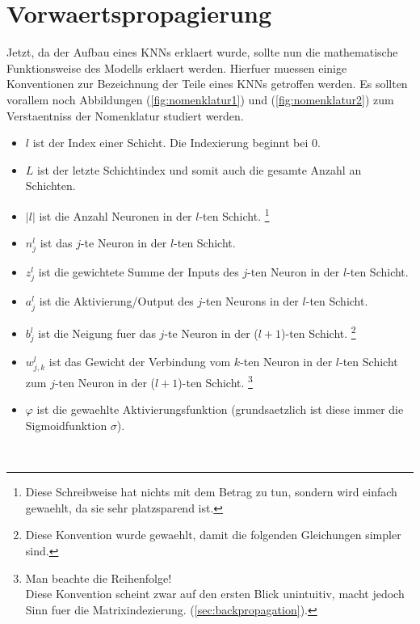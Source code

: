 \section{Vorwaertspropagierung}
Jetzt, da der Aufbau eines KNNs erklaert wurde, sollte nun die mathematische Funktionsweise
des Modells erklaert werden. Hierfuer muessen einige Konventionen zur
Bezeichnung der Teile eines KNNs getroffen werden. Es sollten vorallem noch
Abbildungen (\ref{fig:nomenklatur1}) und (\ref{fig:nomenklatur2}) zum Verstaentniss der Nomenklatur studiert werden.
\begin{itemize}
\item{$l$ ist der Index einer Schicht. Die Indexierung beginnt bei 0.}
\item{$L$ ist der letzte Schichtindex und somit auch die gesamte Anzahl an Schichten.}
\item{$|l|$ ist die Anzahl Neuronen in der $l$-ten Schicht.
    \footnote{
      Diese Schreibweise hat nichts mit dem Betrag zu tun, sondern wird einfach
      gewaehlt, da sie sehr platzsparend ist.
    }
  }
\item{$n_j^l$ ist das $j$-te Neuron in der $l$-ten Schicht.}
\item{$z_j^l$ ist die gewichtete Summe der Inputs des $j$-ten Neuron in der $l$-ten Schicht.}
\item{$a_j^l$ ist die Aktivierung/Output des $j$-ten Neurons in der $l$-ten Schicht.}
\item{$b_j^l$ ist die Neigung fuer das $j$-te Neuron in der ($l+1$)-ten Schicht.
    \footnote{
      Diese Konvention wurde gewaehlt, damit die folgenden Gleichungen simpler sind.
    }
  }
\item{$w_{j,k}^l$ ist das Gewicht der Verbindung vom $k$-ten Neuron
    in der $l$-ten Schicht zum $j$-ten Neuron in der ($l+1$)-ten Schicht.
    \footnote{
      Man beachte die Reihenfolge!\\
      Diese Konvention scheint zwar auf den ersten Blick unintuitiv, macht jedoch
      Sinn fuer die Matrixindezierung.
      (\ref{sec:backpropagation}).
    }
}
\item{$\varphi$ ist die gewaehlte Aktivierungsfunktion (grundsaetzlich ist diese
    immer die Sigmoidfunktion $\sigma$).}
\end{itemize}
\\
